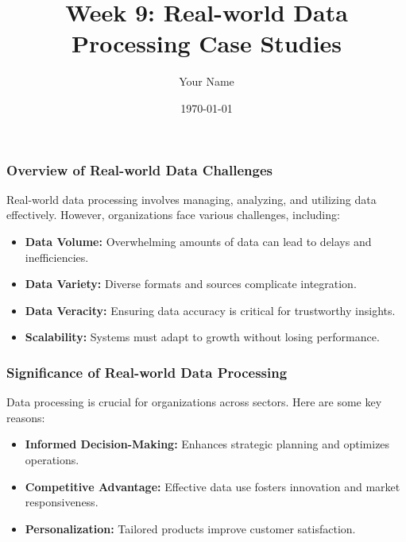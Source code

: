 \documentclass{beamer}
\title{Week 9: Real-world Data Processing Case Studies}
\author{Your Name}
\institute{Your Institution}
\date{\today}
\begin{document}
\frame{\titlepage}

\begin{frame}[fragile]
    \titlepage
\end{frame}

\begin{frame}[fragile]
    \frametitle{Overview of Real-world Data Challenges}
    Real-world data processing involves managing, analyzing, and utilizing data effectively. However, organizations face various challenges, including:
    \begin{itemize}
        \item \textbf{Data Volume:} Overwhelming amounts of data can lead to delays and inefficiencies.
        \item \textbf{Data Variety:} Diverse formats and sources complicate integration.
        \item \textbf{Data Veracity:} Ensuring data accuracy is critical for trustworthy insights.
        \item \textbf{Scalability:} Systems must adapt to growth without losing performance.
    \end{itemize}
\end{frame}

\begin{frame}[fragile]
    \frametitle{Significance of Real-world Data Processing}
    Data processing is crucial for organizations across sectors. Here are some key reasons:
    \begin{itemize}
        \item \textbf{Informed Decision-Making:} Enhances strategic planning and optimizes operations.
        \item \textbf{Competitive Advantage:} Effective data use fosters innovation and market responsiveness.
        \item \textbf{Personalization:} Tailored products improve customer satisfaction.
    \end{itemize}
\end{frame}
\end{document}
